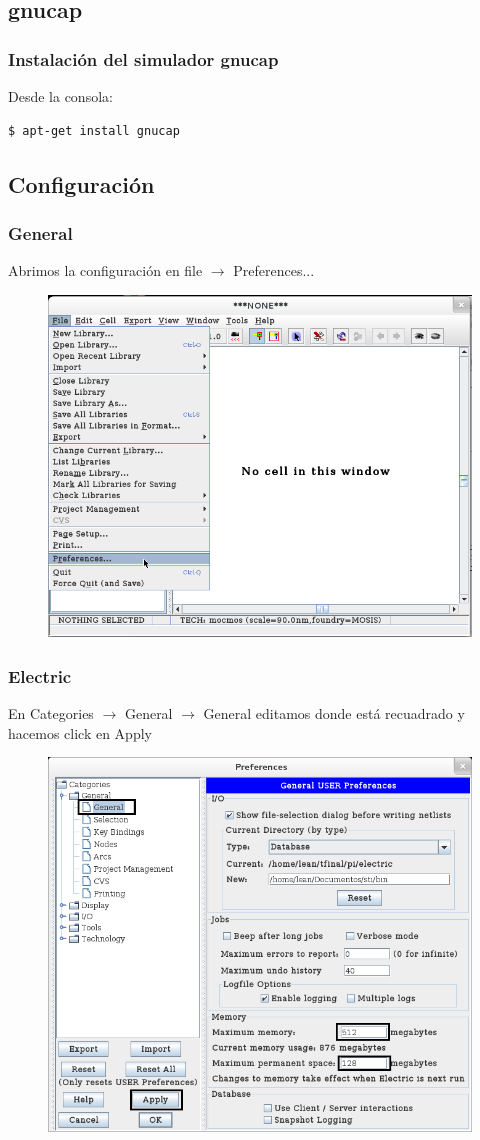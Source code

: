 \documentclass{beamer}
\begin{document}
\begin{frame}[fragile]
\subsection{gnucap}
\frametitle{Instalación del simulador gnucap}

\noindent Desde la consola:
\begin{lstlisting}[language=bash]
 $ apt-get install gnucap
\end{lstlisting}
\end{frame}
\begin{frame}[fragile]
\section{Configuración}
\frametitle{General}

\noindent Abrimos la configuración en file $\rightarrow$ Preferences...

\begin{figure}
\includegraphics[width=0.6\linewidth]{figuras/configuracionElectric-1.png}
\end{figure}
\end{frame}


\begin{frame}
\frametitle{Electric}

\noindent En Categories $\rightarrow$ General $\rightarrow$ General editamos donde está recuadrado y hacemos click en Apply 

\begin{figure}
\includegraphics[width=0.55\linewidth]{figuras/configuracionElectric-2.png}
\end{figure}
\end{frame}
\end{document}

